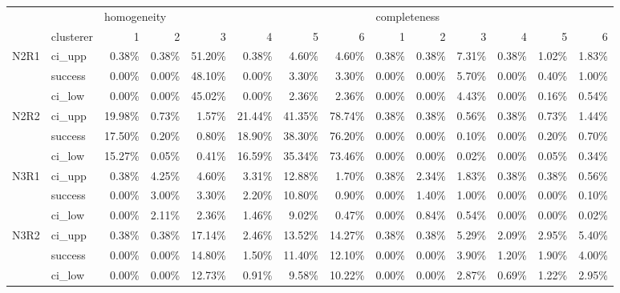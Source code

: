 \begin{tabular}{llrrrrrrrrrrrr}
\toprule
     & {} & \multicolumn{6}{l}{homogeneity} & \multicolumn{6}{l}{completeness} \\
     & clusterer &           1 &      2 &      3 &      4 &      5 &      6 &            1 &     2 &      3 &     4 &     5 &      6 \\
\midrule
N2R1 & ci\_upp &       0.38\% &  0.38\% & 51.20\% &  0.38\% &  4.60\% &  4.60\% &        0.38\% & 0.38\% &  7.31\% & 0.38\% & 1.02\% &  1.83\% \\
     & success &       0.00\% &  0.00\% & 48.10\% &  0.00\% &  3.30\% &  3.30\% &        0.00\% & 0.00\% &  5.70\% & 0.00\% & 0.40\% &  1.00\% \\
     & ci\_low &       0.00\% &  0.00\% & 45.02\% &  0.00\% &  2.36\% &  2.36\% &        0.00\% & 0.00\% &  4.43\% & 0.00\% & 0.16\% &  0.54\% \\
N2R2 & ci\_upp &      19.98\% &  0.73\% &  1.57\% & 21.44\% & 41.35\% & 78.74\% &        0.38\% & 0.38\% &  0.56\% & 0.38\% & 0.73\% &  1.44\% \\
     & success &      17.50\% &  0.20\% &  0.80\% & 18.90\% & 38.30\% & 76.20\% &        0.00\% & 0.00\% &  0.10\% & 0.00\% & 0.20\% &  0.70\% \\
     & ci\_low &      15.27\% &  0.05\% &  0.41\% & 16.59\% & 35.34\% & 73.46\% &        0.00\% & 0.00\% &  0.02\% & 0.00\% & 0.05\% &  0.34\% \\
N3R1 & ci\_upp &       0.38\% &  4.25\% &  4.60\% &  3.31\% & 12.88\% &  1.70\% &        0.38\% & 2.34\% &  1.83\% & 0.38\% & 0.38\% &  0.56\% \\
     & success &       0.00\% &  3.00\% &  3.30\% &  2.20\% & 10.80\% &  0.90\% &        0.00\% & 1.40\% &  1.00\% & 0.00\% & 0.00\% &  0.10\% \\
     & ci\_low &       0.00\% &  2.11\% &  2.36\% &  1.46\% &  9.02\% &  0.47\% &        0.00\% & 0.84\% &  0.54\% & 0.00\% & 0.00\% &  0.02\% \\
N3R2 & ci\_upp &       0.38\% &  0.38\% & 17.14\% &  2.46\% & 13.52\% & 14.27\% &        0.38\% & 0.38\% &  5.29\% & 2.09\% & 2.95\% &  5.40\% \\
     & success &       0.00\% &  0.00\% & 14.80\% &  1.50\% & 11.40\% & 12.10\% &        0.00\% & 0.00\% &  3.90\% & 1.20\% & 1.90\% &  4.00\% \\
     & ci\_low &       0.00\% &  0.00\% & 12.73\% &  0.91\% &  9.58\% & 10.22\% &        0.00\% & 0.00\% &  2.87\% & 0.69\% & 1.22\% &  2.95\% \\

\end{tabular}
